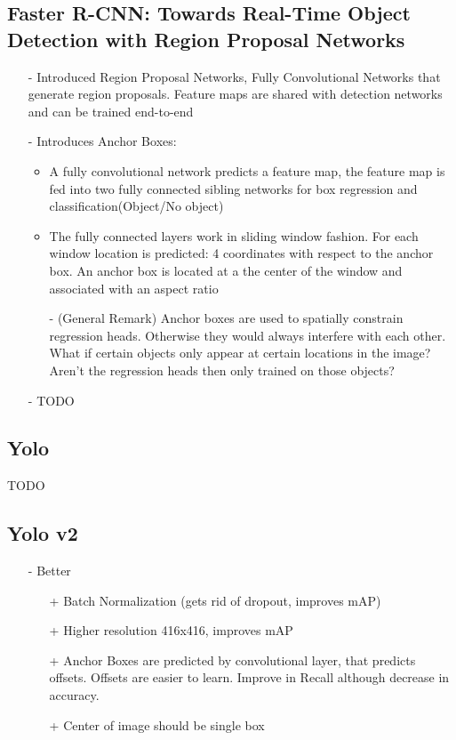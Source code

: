 \documentclass{article}
\begin{document}
\begin{multicols}{2}
		\subsection{Faster R-CNN: Towards Real-Time Object Detection with Region Proposal Networks\cite{Rena}}
		\begin{itemize}
			\item[-] Introduced Region Proposal Networks, Fully Convolutional Networks that generate region proposals. Feature maps are shared with detection networks and can be trained end-to-end
			\item[-] Introduces Anchor Boxes:
			\begin{itemize}
				\item A fully convolutional network predicts a feature map, the feature map is fed into two fully connected sibling networks for box regression and classification(Object/No object)
				\item The fully connected layers work in sliding window fashion. For each window location is predicted: 4 coordinates with respect to the anchor box. An anchor box is located at a the center of the window and associated with an aspect ratio
				\item[-] (General Remark) Anchor boxes are used to spatially constrain regression heads. Otherwise they would always interfere with each other. What if certain objects only appear at certain locations in the image? Aren't the regression heads then only trained on those objects?
			\end{itemize}
			\item[-] TODO
		\end{itemize}
		\subsection{Yolo}
		TODO
		\subsection{Yolo v2}
		\begin{itemize}
			\item[-] Better
			\begin{itemize}
				\item[+] Batch Normalization (gets rid of dropout, improves mAP)
				\item[+] Higher resolution 416x416, improves mAP
				\item[+] Anchor Boxes are predicted by convolutional layer, that predicts offsets. Offsets are easier to learn. Improve in Recall although decrease in accuracy.
				\item[+] Center of image should be single box
			\end{itemize}
		\end{itemize}

\end{multicols}
\end{document}
